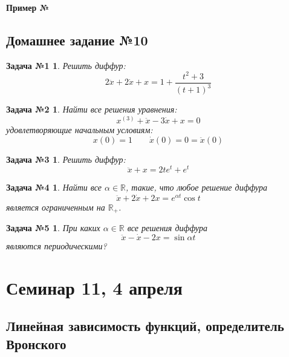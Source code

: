\documentclass[a4paper,12pt]{article}
\newtheorem*{task1}{Задача №1}
\newtheorem*{task2}{Задача №2}
\newtheorem*{task3}{Задача №3}
\newtheorem*{task4}{Задача №4}
\newtheorem*{task5}{Задача №5}
\newcommand{\R}{\mathbb{R}}
\newcommand{\dx}{\dot{x}}
\newcommand{\ddx}{\ddot{x}}
\begin{document}
\textbf{Пример №}


\subsection{Домашнее задание №10}


\begin{task1}
	Решить диффур:
	\[2\ddx + 2\dx + x = 1 + \dfrac{t^2 + 3}{(t + 1)^3}\]
\end{task1}
%

\begin{task2}
	Найти все решения уравнения:
	\[x^{(3)} + \ddx - 3\dx + x = 0\]
	удовлетворяющие начальным условиям:
	\[x(0) = 1\qquad \dx(0) = 0 = \ddx(0)\]
\end{task2}
%

\begin{task3}
	Решить диффур:
	\[\ddx + x = 2te^t + e^t\]
\end{task3}
%	

\begin{task4}
	Найти все $\alpha \in \R$, такие, что любое решение диффура
	\[\ddx + 2\dx + 2x = e^{\alpha t}\cos t\] является ограниченным на $\R_+$.
\end{task4}
%

\begin{task5}
	При каких $\alpha \in \R$ все решения диффура
	\[\ddx - \dx - 2x = \sin \alpha t\] являются периодическими?
\end{task5}
%

\section{Семинар 11, 4 апреля}

\subsection{Линейная зависимость функций, определитель Вронского}
\end{document}
